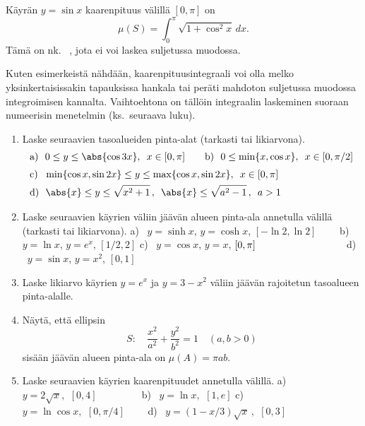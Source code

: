 \begin{Exa} Käyrän $y=\sin x$ kaarenpituus välillä $[0,\pi]$ on
\[
\mu(S)=\int_0^\pi \sqrt{1+\cos^2 x}\,dx.
\]
Tämä on nk.\ 
%
, jota ei voi laskea suljetussa muodossa. \loppu
\end{Exa} 
Kuten esimerkeistä nähdään, kaarenpituusintegraali voi olla melko yksinkertaisissakin
tapauksissa hankala tai peräti mahdoton suljetussa muodossa integroimisen kannalta.
Vaihtoehtona on tällöin integraalin laskeminen suoraan numeerisin menetelmin
(ks.\ seuraava luku).

\Harj
\begin{enumerate}

\item
Laske seuraavien tasoalueiden pinta-alat (tarkasti tai likiarvona).
\begin{align*}
&\text{a)}\ \ 0 \le y \le \abs{\cos 3x},\,\ x\in[0,\pi] \qquad
 \text{b)}\ \ 0 \le \min\{x,\cos x\},\,\ x\in[0,\pi/2] \\[1mm]
&\text{c)}\ \ \min\{\cos x,\sin 2x\} \le y \le \max\{\cos x,\sin 2x\},\,\ x\in[0,\pi] \\
&\text{d)}\ \ \abs{x} \le y \le \sqrt{x^2+1}\,,\,\ \abs{x} \le \sqrt{a^2-1}\,,\,\ a>1
\end{align*}

\item
Laske seuraavien käyrien väliin jäävän alueen pinta-ala annetulla välillä 
(tarkasti tai likiarvona). \vspace{1mm}\newline
a) \ $y=\sinh x$, $y=\cosh x$, $[-\ln 2,\ln 2] \qquad$
b) \ $y=\ln x$, $y=e^{x}$, $[1/2,2]$ \newline
c) \ $y=\cos x$, $y=x$, $[0,\pi] \hspace{3.1cm}$
d) \ $y=\sin x$, $y=x^2$, $[0,1]$

\item
Laske likiarvo käyrien $y=e^x$ ja $y=3-x^2$ väliin jäävän rajoitetun taso\-alueen pinta-alalle.

\item \label{H-int-8: ellipsin pinta-ala}
Näytä, että ellipsin
\[
S: \quad \frac{x^2}{a^2}+\frac{y^2}{b^2}=1 \quad (a,b>0)
\]
sisään jäävän alueen pinta-ala on $\mu(A)=\pi ab$.

\item
Laske seuraavien käyrien kaarenpituudet annetulla välillä. \vspace{1mm}\newline
a) \ $y=2\sqrt{x},\,\ [0,4] \qquad\qquad\,$
b) \ $y=\ln x,\,\ [1,e]$ \newline
c) \ $y=\ln\cos x,\,\ [0,\pi/4] \qquad$
d) \ $y=(1-x/3)\sqrt{x}\,,\,\ [0,3]$


\end{enumerate}
